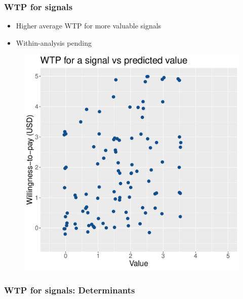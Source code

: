 \documentclass[11pt,hyperref={bookmarks=false}]{beamer}
\begin{document}
\begin{frame}
\frametitle{WTP for signals}
\begin{itemize}
\item Higher average WTP for more valuable signals
\item Within-analysis pending
\end{itemize}
\begin{figure}[h]
\includegraphics[scale=0.4]{Graphs/WTP_curve2.pdf}
\end{figure}
\end{frame}

\begin{frame}
\frametitle{WTP for signals: Determinants}
\footnotesize


\end{frame}
\end{document}
